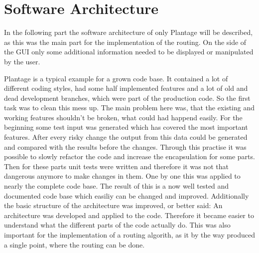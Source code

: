 \section{Software Architecture}
In the following part the software architecture of only Plantage will be described, as this was the main part for the implementation of the routing. On the side of the GUI only some additional information needed to be displayed or manipulated by the user.

Plantage is a typical example for a grown code base. It contained a lot of different coding styles, had some half implemented features and a lot of old and dead development branches, which were part of the production code. So the first task was to clean this mess up. The main problem here was, that the existing and working features shouldn't be broken, what could had happend easily. For the beginning some test input was generated which has covered the most important features. After every risky change the output from this data could be generated and compared with the results before the changes. Through this practise it was possible to slowly refactor the code and increase the encapsulation for some parts. Then for these parts unit tests were written and therefore it was not that dangerous anymore to make changes in them. One by one this was applied to nearly the complete code base. The result of this is a now well tested and documented code base which easiliy can be changed and improved. Additionally the basic structure of the architecture was improved, or better said: An architecture was developed and applied to the code. Therefore it became easier to understand what the different parts of the code actually do. This was also important for the implementation of a routing algorith, as it by the way produced a single point, where the routing can be done.